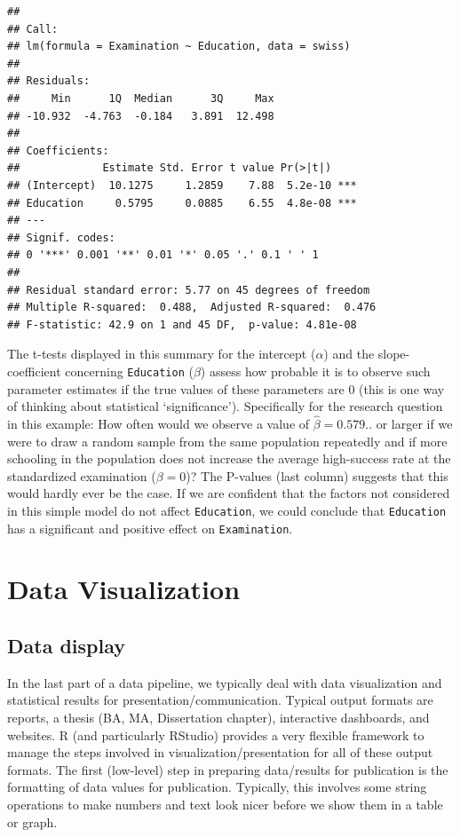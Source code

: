 \documentclass[
  12pt,
]{style/krantz}
\begin{document}
\begin{verbatim}
## 
## Call:
## lm(formula = Examination ~ Education, data = swiss)
## 
## Residuals:
##     Min      1Q  Median      3Q     Max 
## -10.932  -4.763  -0.184   3.891  12.498 
## 
## Coefficients:
##             Estimate Std. Error t value Pr(>|t|)    
## (Intercept)  10.1275     1.2859    7.88  5.2e-10 ***
## Education     0.5795     0.0885    6.55  4.8e-08 ***
## ---
## Signif. codes:  
## 0 '***' 0.001 '**' 0.01 '*' 0.05 '.' 0.1 ' ' 1
## 
## Residual standard error: 5.77 on 45 degrees of freedom
## Multiple R-squared:  0.488,  Adjusted R-squared:  0.476 
## F-statistic: 42.9 on 1 and 45 DF,  p-value: 4.81e-08
\end{verbatim}

The t-tests displayed in this summary for the intercept (\(\alpha\)) and the slope-coefficient concerning \texttt{Education} (\(\beta\)) assess how probable it is to observe such parameter estimates if the true values of these parameters are 0 (this is one way of thinking about statistical `significance'). Specifically for the research question in this example: How often would we observe a value of \(\hat{\beta}=0.579..\) or larger if we were to draw a random sample from the same population repeatedly and if more schooling in the population does not increase the average high-success rate at the standardized examination (\(\beta=0\))? The P-values (last column) suggests that this would hardly ever be the case. If we are confident that the factors not considered in this simple model do not affect \texttt{Education}, we could conclude that \texttt{Education} has a significant and positive effect on \texttt{Examination}.

\hypertarget{data-visualization}{%
\chapter{Data Visualization}\label{data-visualization}}

\hypertarget{data-display}{%
\section{Data display}\label{data-display}}

In the last part of a data pipeline, we typically deal with data visualization and statistical results for presentation/communication. Typical output formats are reports, a thesis (BA, MA, Dissertation chapter), interactive dashboards, and websites. R (and particularly RStudio) provides a very flexible framework to manage the steps involved in visualization/presentation for all of these output formats. The first (low-level) step in preparing data/results for publication is the formatting of data values for publication. Typically, this involves some string operations to make numbers and text look nicer before we show them in a table or graph.
\end{document}
